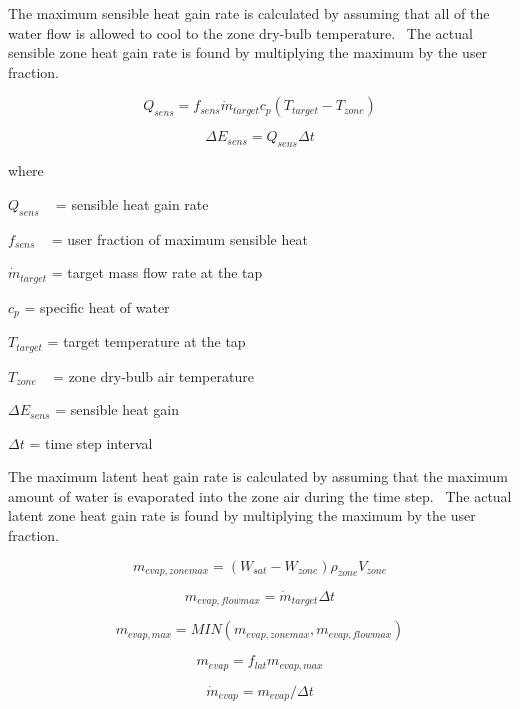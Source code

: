 The maximum sensible heat gain rate is calculated by assuming that all of the water flow is allowed to cool to the zone dry-bulb temperature.~ The actual sensible zone heat gain rate is found by multiplying the maximum by the user fraction.

\begin{equation}
{Q_{sens}} = {f_{sens}}{\dot m_{target}}{c_p}\left( {{T_{target}} - {T_{zone}}} \right)
\end{equation}

\begin{equation}
\Delta {E_{sens}} = {Q_{sens}}\Delta t
\end{equation}

where

\({Q_{sens}}\) ~ = sensible heat gain rate

\({f_{sens}}\) ~ = user fraction of maximum sensible heat

\({\dot m_{target}}\) = target mass flow rate at the tap

\({c_p}\) = specific heat of water

\({T_{target}}\) = target temperature at the tap

\({T_{zone}}\) ~ = zone dry-bulb air temperature

\(\Delta {E_{sens}}\) = sensible heat gain

\(\Delta t\) = time step interval

The maximum latent heat gain rate is calculated by assuming that the maximum amount of water is evaporated into the zone air during the time step.~ The actual latent zone heat gain rate is found by multiplying the maximum by the user fraction.

\begin{equation}
{m_{evap,zonemax}} = \left( {{W_{sat}} - {W_{zone}}} \right){\rho_{zone}}{V_{zone}}
\end{equation}

\begin{equation}
{m_{evap,flowmax}} = {\dot m_{target}}\Delta t
\end{equation}

\begin{equation}
{m_{evap,max}} = MIN({m_{evap,zonemax}},{m_{evap,flowmax}})
\end{equation}

\begin{equation}
{m_{evap}} = {f_{lat}}{m_{evap,max}}
\end{equation}

\begin{equation}
{\dot m_{evap}} = {m_{evap}}/\Delta t
\end{equation}


